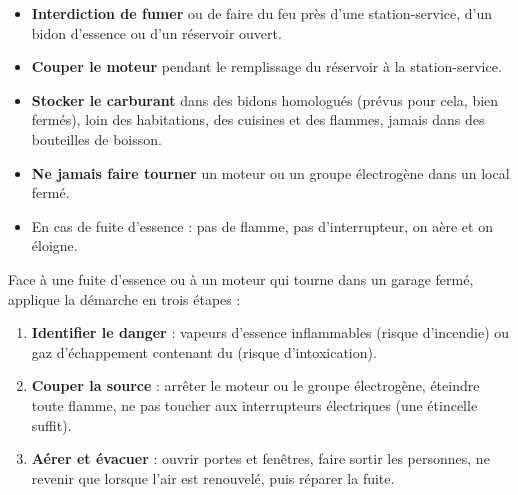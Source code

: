 \documentclass[11pt]{article}
\newcommand{\cle}[1]{{\popxbold\color{popdark}#1}}
\begin{document}
\begin{aretenir}
\begin{itemize}
\item \textbf{Interdiction de fumer} ou de faire du feu près d'une station-service, d'un bidon d'essence ou d'un réservoir ouvert.
\item \textbf{Couper le moteur} pendant le remplissage du réservoir à la station-service.
\item \textbf{Stocker le carburant} dans des \cle{bidons homologués} (prévus pour cela, bien fermés), loin des habitations, des cuisines et des flammes, jamais dans des bouteilles de boisson.
\item \textbf{Ne jamais faire tourner} un moteur ou un groupe électrogène dans un local fermé.
\item En cas de fuite d'essence : pas de flamme, pas d'interrupteur, on aère et on éloigne.
\end{itemize}
\end{aretenir}

\begin{methode}
Face à une fuite d'essence ou à un moteur qui tourne dans un garage fermé, applique la démarche en trois étapes :
\begin{enumerate}
\item \textbf{Identifier le danger} : vapeurs d'essence inflammables (risque d'incendie) ou gaz d'échappement contenant du  (risque d'intoxication).
\item \textbf{Couper la source} : arrêter le moteur ou le groupe électrogène, éteindre toute flamme, ne pas toucher aux interrupteurs électriques (une étincelle suffit).
\item \textbf{Aérer et évacuer} : ouvrir portes et fenêtres, faire sortir les personnes, ne revenir que lorsque l'air est renouvelé, puis réparer la fuite.
\end{enumerate}
\end{methode}
\end{document}
